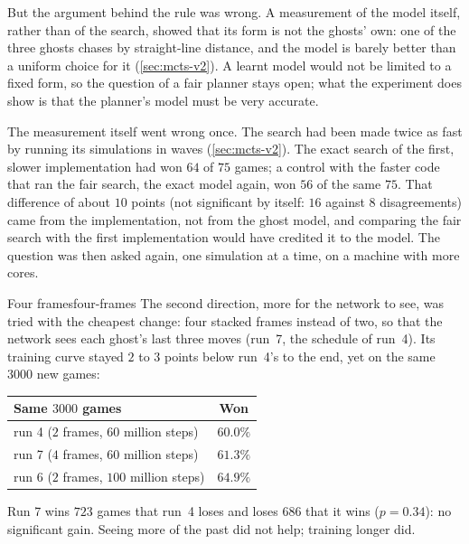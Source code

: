 But the argument behind the rule was wrong. A measurement of the model
itself, rather than of the search, showed that its form is not the ghosts'
own: one of the three ghosts chases by straight-line distance, and the
model is barely better than a uniform choice for it
(\cref{sec:mcts-v2}). A learnt model would not be limited to a fixed form,
so the question of a fair planner stays open; what the experiment does show
is that the planner's model must be very accurate.

The measurement itself went wrong once. The search had been made twice as
fast by running its simulations in waves (\cref{sec:mcts-v2}). The exact
search of the first, slower implementation had won $64$ of $75$ games; a
control with the faster code that ran the fair search, the exact model
again, won $56$ of the same $75$. That difference of about $10$ points
(not significant by itself: $16$ against $8$ disagreements) came from the
implementation, not from the ghost model, and comparing the fair search
with the first implementation would have credited it to the model. The
question was then asked again, one simulation at a time, on a machine with
more cores.

\begin{pacman}{Four frames}{four-frames}
  The second direction, more for the network to see, was tried with the
  cheapest change: four stacked frames instead of two, so that the network
  sees each ghost's last three moves (run~7, the schedule of run~4). Its
  training curve stayed $2$ to $3$ points below run~4's to the end, yet on
  the same $3000$ new games:
  \begin{center}
    \begin{tabular}{@{}lc@{}}
      \toprule
      Same $3000$ games & Won \\
      \midrule
      run 4 ($2$ frames, $60$ million steps) & $60.0\%$ \\
      run 7 ($4$ frames, $60$ million steps) & $61.3\%$ \\
      run 6 ($2$ frames, $100$ million steps) & $64.9\%$ \\
      \bottomrule
    \end{tabular}
  \end{center}
  Run 7 wins $723$ games that run~4 loses and loses $686$ that it wins
  ($p = 0.34$): no significant gain. Seeing more of the past did not help;
  training longer did.
\end{pacman}

